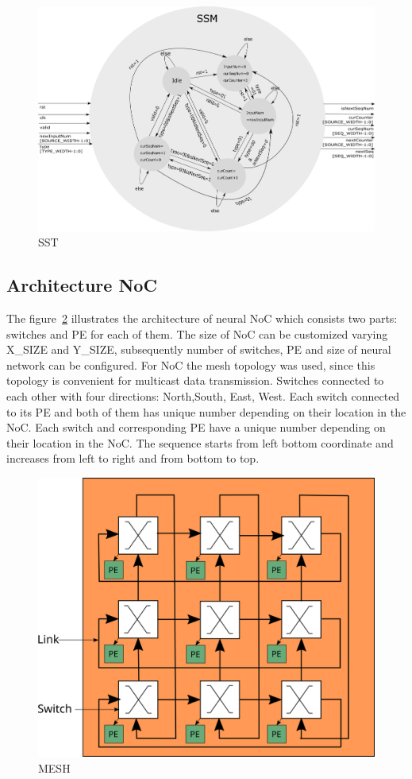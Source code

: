 \begin{figure}
    \includegraphics[width=\textwidth]{Figures/sst.pdf}
    \caption{SST} 
    \label{figure:sst}
\end{figure}


\subsection{Architecture NoC}
The figure~\ref{figure:mesh} illustrates the architecture of neural NoC which consists two parts: switches and PE for each of them. The size of NoC can be customized varying X_SIZE and Y_SIZE,  subsequently number of switches, PE and size of neural network can be configured. For NoC the mesh topology was used, since this topology is convenient for multicast data transmission. Switches connected to each other with four directions: North,South, East, West. Each switch connected to its PE and both of them has unique number depending on their location in the NoC. Each switch and corresponding PE have a unique number depending on their location in the NoC. The sequence starts from left bottom coordinate and increases from left to right and from bottom to top. 

\begin{figure}
    \includegraphics[width=\textwidth]{Figures/mesh.svg}
    \caption{MESH} 
    \label{figure:mesh}
\end{figure}

